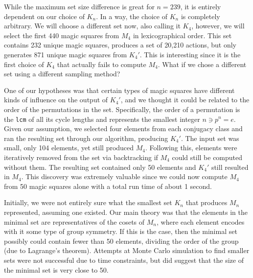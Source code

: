 \documentclass[12pt]{report}
\begin{document}
\par While the maximum set size difference is great for $n=239$, it is entirely dependent on our
choice of $K_n$. In a way, the choice of $K_n$ is completely arbitrary. We will choose a different
set now, also calling it $K_4$, however, we will select the first 440 magic squares from $M_4$ in lexicographical order.
This set contains 232 unique magic squares, produces a set of 20,210 actions, but only generates
871 unique magic squares from $K_4\prime$. This is interesting since it is the first
choice of $K_4$ that actually fails to compute $M_4$. What if we chose a different set using a
different sampling method?

\par One of our hypotheses was that certain types of magic squares have different kinds of
influence on the output of $K_4\prime$, and we thought it could be related to the order
of the permutations in the set. Specifically, the order of a permutation is the \texttt{lcm} of all
its cycle lengths and represents the smallest integer $n \ni p^n = e$. Given our assumption, we
selected four elements from each conjugacy class and ran the resulting set through our algorithm, producing
$K_4\prime$. The input set was small, only 104 elements, yet still produced $M_4$. Following
this, elements were iteratively removed from the set via backtracking if $M_4$
could still be computed without them. The resulting set contained only 50 elements and
$K_4\prime$ still resulted in $M_4$. This discovery was extremely valuable since we could
now compute $M_4$ from 50 magic squares alone with a total run time of about 1 second.

\par Initially, we were not entirely sure what the smallest set $K_n$ that produces $M_n$
represented, assuming one existed. Our main theory was that the elements in the minimal set are
representatives of the cosets of $M_n$, where each element encodes with it some type of group
symmetry. If this is the case, then the minimal set possibly could contain fewer than 50 elements,
dividing the order of the group (due to Lagrange's theorem). Attempts at Monte Carlo simulation to
find smaller sets were not successful due to time constraints, but did suggest that the size of the
minimal set is very close to 50.
\end{document}
